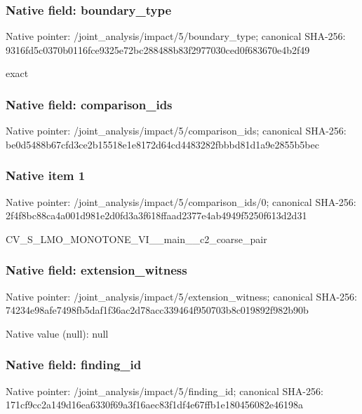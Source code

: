\documentclass[10pt,a4paper]{article}
\begin{document}
\subsubsection{Native field: boundary\_\allowbreak{}type}
Native pointer: /joint\_\allowbreak{}analysis/impact/5/boundary\_\allowbreak{}type; canonical SHA-256: 9316fd5c0370b0116fce9325e72bc288488b83f2977030ced0f683670e4b2f49

\begingroup\raggedright\sloppy exact\par\endgroup

\subsubsection{Native field: comparison\_\allowbreak{}ids}
Native pointer: /joint\_\allowbreak{}analysis/impact/5/comparison\_\allowbreak{}ids; canonical SHA-256: be0d5488b67cfd3ce2b15518e1e8172d64cd4483282fbbbd81d1a9e2855b5bec

\subsubsection{Native item 1}
Native pointer: /joint\_\allowbreak{}analysis/impact/5/comparison\_\allowbreak{}ids/0; canonical SHA-256: 2f4f8bc88ca4a001d981e2d0fd3a3f618ffaad2377e4ab4949f5250f613d2d31

\begingroup\raggedright\sloppy CV\_\allowbreak{}S\_\allowbreak{}LMO\_\allowbreak{}MONOTONE\_\allowbreak{}VI\_\allowbreak{}\_\allowbreak{}main\_\allowbreak{}\_\allowbreak{}c2\_\allowbreak{}coarse\_\allowbreak{}pair\par\endgroup

\subsubsection{Native field: extension\_\allowbreak{}witness}
Native pointer: /joint\_\allowbreak{}analysis/impact/5/extension\_\allowbreak{}witness; canonical SHA-256: 74234e98afe7498fb5daf1f36ac2d78acc339464f950703b8c019892f982b90b

Native value (null): null

\subsubsection{Native field: finding\_\allowbreak{}id}
Native pointer: /joint\_\allowbreak{}analysis/impact/5/finding\_\allowbreak{}id; canonical SHA-256: 171cf9cc2a149d16ea6330f69a3f16aec83f1df4e67ffb1e180456082e46198a
\end{document}

